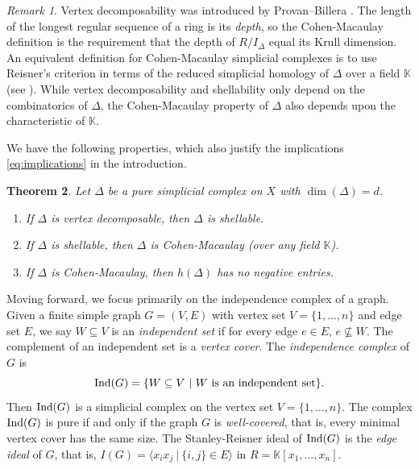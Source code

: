 \documentclass[10pt,a4paper]{amsart}
\theoremstyle{plain}
\newtheorem{theorem}{Theorem}[section]
\theoremstyle{definition}
\theoremstyle{remark}
\newtheorem{remark}[theorem]{Remark}
\numberwithin{equation}{section}
\numberwithin{equation}{section}
\begin{document}
\begin{remark}
    Vertex decomposability was introduced by Provan--Billera \cite{PB1980}.
       The length of the longest regular sequence of a ring is its {\it depth},
    so the Cohen-Macaulay definition is the requirement that
    the depth of $R/I_\Delta$ equal its Krull dimension. 
    An equivalent definition for Cohen-Macaulay simplicial complexes is
    to use Reisner's criterion in terms of the reduced simplicial homology of
    $\Delta$ over a field $\mathbb{K}$ (see \cite[Theorem 5.3.5]{VBook}).  While
    vertex decomposability and shellability only depend on the combinatorics
    of $\Delta$, the Cohen-Macaulay property of $\Delta$ also depends upon
    the characteristic of $\mathbb{K}$.
\end{remark}

We have the following properties, which also justify the implications \eqref{eq:implications} in the introduction.

\begin{theorem}\label{thm:mainproperties}
Let $\Delta$ be a pure simplicial complex on $X$ with 
$\dim(\Delta) =d$.
\begin{enumerate}
    \item \cite[Corollary 2.9]{PB1980} If $\Delta$ is vertex decomposable, then $\Delta$ is shellable.
    \item \cite[Theorem 5.3.18]{VBook} If $\Delta$ is shellable, then $\Delta$ is Cohen-Macaulay (over
    any field $\mathbb{K}$).
    \item  \cite[Theorem 5.4.8]{VBook}
    If $\Delta$ is Cohen-Macaulay, then $h(\Delta)$
    has no negative entries.
\end{enumerate}
\end{theorem}

Moving forward, we focus primarily on the independence complex of a graph.
Given a finite simple graph $G = (V,E)$ with vertex set $V = \{1,\ldots,n\}$
and edge set $E$, we say $W \subseteq V$ is an {\it independent set} if
for every edge $e \in E$, $e \not\subseteq W$.  The complement 
of an independent set is a {\it vertex cover}.  The {\it 
independence complex} of $G$ is
$${\rm Ind}(G) = \{W \subseteq V ~|~ \mbox{$W$ is an independent set}\}.$$
Then ${\rm Ind}(G)$ is a simplicial complex on the vertex set $V = \{1,\ldots,n\}$.  The complex ${\rm Ind}(G)$ is pure  if and only if 
the graph $G$ is {\it well-covered}, that is, every minimal vertex
cover has the same size. The Stanley-Reisner ideal of ${\rm Ind}(G)$ is the 
{\it edge ideal} of $G$, that is, $I(G) = \langle x_ix_j ~|~ \{i,j\} \in E \rangle$ in $R = \mathbb{K}[x_1,\ldots,x_n]$.  
\end{document}
